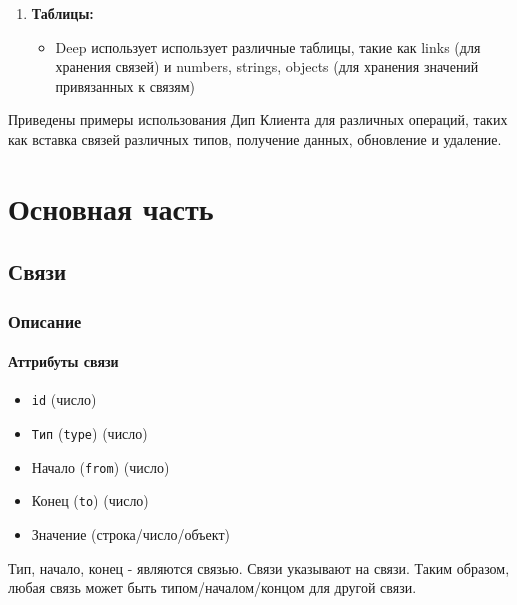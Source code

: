 \documentclass{article}
\begin{document}
\begin{enumerate}
  \item \textbf{Таблицы:}
        \begin{itemize}
          \item Deep использует использует различные таблицы, такие как links
                (для хранения связей) и numbers, strings, objects (для хранения
                значений
                привязанных к связям)
        \end{itemize}
\end{enumerate}

Приведены примеры использования Дип Клиента для различных операций, таких как
вставка связей различных типов, получение данных, обновление и удаление.


\tableofcontents

\section{Основная часть}

\subsection{Связи}

\subsubsection{Описание}

\paragraph{Аттрибуты связи}

\begin{itemize}
  \item \texttt{id} (число)
  \item \texttt{Тип} (\texttt{type}) (число)
  \item Начало (\texttt{from}) (число)
  \item Конец (\texttt{to}) (число)
  \item Значение (строка/число/объект)
\end{itemize}

Тип, начало, конец - являются связью. Связи указывают на связи. Таким образом,
любая связь может быть типом/началом/концом для другой связи.
\end{document}
